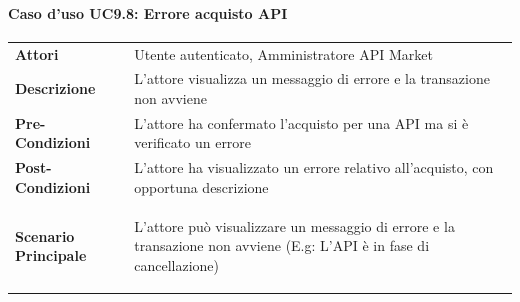 \paragraph{Caso d'uso UC9.8: Errore acquisto API}
\label{UC9_8}

\begin{minipage}{\linewidth}
	\begin{tabular}{ l | p{11cm}}
		\hline
		\rowcolor{Gray}
		\multicolumn{2}{c}{UC9.8 - Errore acquisto API} \\
		\hline
		\textbf{Attori} & Utente autenticato, Amministratore API Market \\
		\textbf{Descrizione} & L'attore visualizza un messaggio di errore e la transazione non avviene \\
		\textbf{Pre-Condizioni} & L'attore ha confermato l'acquisto per una API ma si è verificato un errore \\
		\textbf{Post-Condizioni} & L'attore ha visualizzato un errore relativo all'acquisto, con opportuna descrizione \\
		\textbf{Scenario Principale} & 
		\begin{enumerate*}[label=(\arabic*.),itemjoin={\newline}]
			\item L'attore può visualizzare un messaggio di errore e la transazione non avviene (E.g: L'API è in fase di cancellazione)
		\end{enumerate*}\\
	\end{tabular}
\end{minipage}